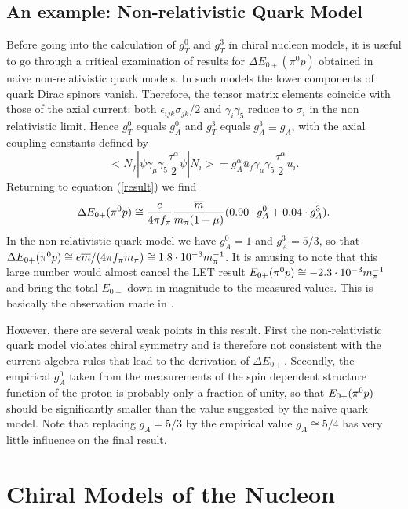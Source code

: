 \subsection{An example: Non-relativistic Quark Model}
Before going into the calculation of $g_T^{0}$ and $g_T^{3}$ in chiral nucleon
models, it is useful to go through a critical examination of results
for $\Delta E_{0+}(\pi^0 p)$ obtained in naive non-relativistic quark models.
In such models the lower components of quark Dirac spinors vanish.  
Therefore, the tensor matrix elements coincide with those of the axial current:
both $\epsilon_{ijk}\sigma_{jk}/2$ and $\gamma_i \gamma_5$ reduce to
$\sigma_i$ in the non relativistic limit. Hence $g_T^{0}$ equals $g_A^0$ and
$g_T^{3}$ equals $g_A^3 \equiv g_A$, with the axial coupling constants defined
by
\begin{equation}
<N_f |\bar{\psi}\gamma_{\mu}\gamma_5 \frac{\tau^{\alpha}}{2}\psi|N_i >
= g_A^{\alpha} \bar{u}_f \gamma_{\mu}\gamma_5 \frac{\tau^{\alpha}}{2}
 u_i .
\end{equation}
Returning to equation (\ref{result}) we find 
\begin{equation}
\label{thumb}
\Delta E_{0+}(\pi^0 p) \cong \frac{e}{4\pi f_\pi}\frac{\overline{m}}{m_\pi (1+\mu) }
 (0.90 \cdot g_A^0 + 0.04 \cdot g_A^3 ).
\end{equation}
In the non-relativistic quark model we have $g_A^0=1$ and $g_A^3=5/3$, so
that $\Delta E_{0+}(\pi^0 p)\cong e\overline{m}/(4\pi f_\pi m_\pi ) \cong 1.8 \cdot 10^{-3}m_{\pi}^{-1}$. It is
amusing to note that this large number would almost cancel the 
LET result $E_{0+}(\pi^0 p) \cong -2.3\cdot 10^{-3}m_{\pi}^{-1}$ and  bring the total $E_{0+}$  down 
in magnitude to the measured values. This is basically the 
observation made in \cite{Nat}.

However, there are several weak points in this result. First the 
non-relativistic quark model violates chiral symmetry and is therefore
not consistent with the current algebra rules that lead to the 
derivation of $\Delta E_{0+}$.   Secondly, the empirical $g_A^0$
taken  from the measurements of the spin dependent structure 
function of the proton is probably only a fraction of unity, so that $E_{0+}(\pi^0 p)$ 
should be significantly smaller than the value suggested by the naive
quark model. Note that replacing $g_A=5/3$ by the empirical value
$g_A\cong 5/4$ has very little influence on the final result.
 
\section{Chiral Models of the Nucleon}
